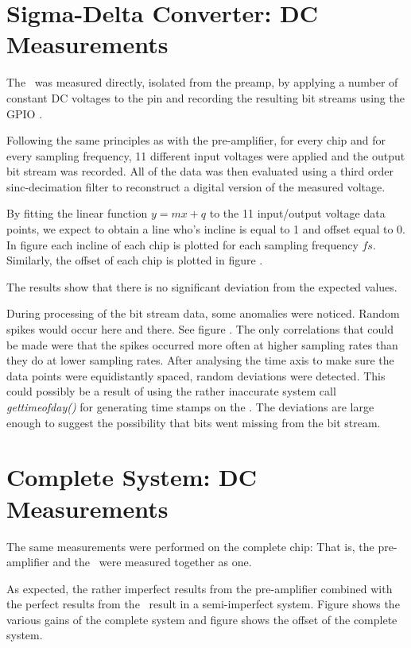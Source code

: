 \section{Sigma-Delta Converter: DC Measurements}
\label{sec:sigdelDC}

The \sdm~was measured directly, isolated from the preamp, by applying a number
of  constant  DC  voltages  to  the  pin  and  recording  the
resulting bit streams using the GPIO \raspi.

Following  the  same  principles as with the pre-amplifier, for every chip and
for every sampling frequency, 11 different input voltages were applied and the
output bit  stream  was  recorded.  All of the data was then evaluated using a
third order sinc-decimation filter to reconstruct a  digital  version  of  the
measured voltage.

By  fitting the linear function $y=mx+q$ to the 11 input/output  voltage  data
points, we expect  to  obtain  a  line  who's incline is equal to 1 and offset
equal  to  0.  In  figure   each incline of each  chip  is
plotted for each sampling frequency $fs$.  Similarly,  the offset of each chip
is plotted in figure .

The  results  show that there is no significant deviation  from  the  expected
values.

During processing of the bit stream data, some anomalies were noticed.  Random
spikes would  occur  here and there. See figure 
.
The only correlations that could  be  made  were that the
spikes  occurred  more  often  at  higher sampling rates than they do at lower
sampling rates. After analysing the time axis  to  make  sure  the data points
were  equidistantly  spaced,  random  deviations  were  detected.  This  could
possibly   be   a  result  of  using  the  rather   inaccurate   system   call
\textit{gettimeofday()}  for  generating  time  stamps  on  the   \raspi.  The
deviations are large enough to  suggest the possibility that bits went missing
from the bit stream.

\section{Complete System: DC Measurements}
\label{sec:systemDC}

The  same  measurements  were  performed  on  the complete chip: That is,  the
pre-amplifier and the \sdm~were measured together as one.

As expected, the rather imperfect results from the pre-amplifier combined with
the  perfect  results  from the \sdm~result in a semi-imperfect system. Figure
 shows the various gains  of
the complete system and  figure  
shows the offset of the complete system.
